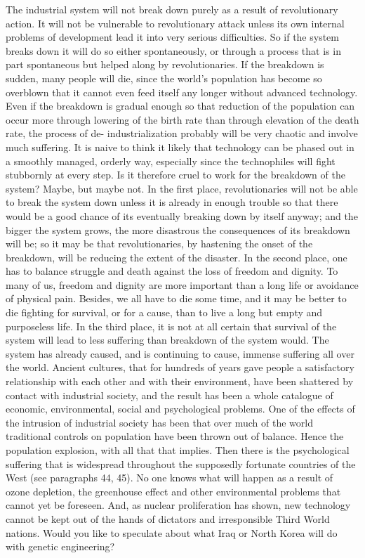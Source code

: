  The industrial system will not break down purely as a result of revolutionary action. It will not be vulnerable to revolutionary attack unless its own internal problems of development lead it into very serious difficulties. So if the system breaks down it will do so either spontaneously, or through a process that is in part spontaneous but helped along by revolutionaries. If the breakdown is sudden, many people will die, since the world’s population has become so overblown that it cannot even feed itself any longer without advanced technology. Even if the breakdown is gradual enough so that reduction of the population can occur more through lowering of the birth rate than through elevation of the death rate, the process of de- industrialization probably will be very chaotic and involve much suffering. It is naive to think it likely that technology can be phased out in a smoothly managed, orderly way, especially since the technophiles will fight stubbornly at every step. Is it therefore cruel to work for the breakdown of the system? Maybe, but maybe not. In the first place, revolutionaries will not be able to break the system down unless it is already in enough trouble so that there would be a good chance of its eventually breaking down by itself anyway; and the bigger the system grows, the more disastrous the consequences of its breakdown will be; so it may be that revolutionaries, by hastening the onset of the breakdown, will be reducing the extent of the disaster.
 In the second place, one has to balance struggle and death against the loss of freedom and dignity. To many of us, freedom and dignity are more important than a long life or avoidance of physical pain. Besides, we all have to die some time, and it may be better to die fighting for survival, or for a cause, than to live a long but empty and purposeless life.
 In the third place, it is not at all certain that survival of the system will lead to less suffering than breakdown of the system would. The system has already caused, and is continuing to cause, immense suffering all over the world. Ancient cultures, that for hundreds of years gave people a satisfactory relationship with each other and with their environment, have been shattered by contact with industrial society, and the result has been a whole catalogue of economic, environmental, social and psychological problems. One of the effects of the intrusion of industrial society has been that over much of the world traditional controls on population have been thrown out of balance. Hence the population explosion, with all that that implies. Then there is the psychological suffering that is widespread throughout the supposedly fortunate countries of the West (see paragraphs 44, 45). No one knows what will happen as a result of ozone depletion, the greenhouse effect and other environmental problems that cannot yet be foreseen. And, as nuclear proliferation has shown, new technology cannot be kept out of the hands of dictators and irresponsible Third World nations. Would you like to speculate about what Iraq or North Korea will do with genetic engineering?
